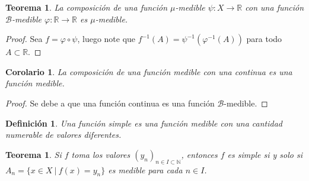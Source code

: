 \documentclass[twoside,12pt,a4 paper,openright]{book}
\newtheorem{teo}[claim]{Teorema}
\newtheorem{cor}[claim]{Corolario}
\newtheorem{defi}[claim]{Definici\'on}
\begin{document}
\begin{teo}
    La composici\'on de una funci\'on $\mu$-medible $\psi:X\to \mathbb R$ con una funci\'on $\mathcal{B}$-medible $\varphi :\mathbb R \to \mathbb R$ es $\mu$-medible.
\end{teo}
\begin{proof}
    Sea $f = \varphi \circ\psi$, luego note que   $f^{-1}(A) = \psi^{-1}(\varphi^{-1}(A))$  para todo $A\subset \mathbb{R}$. 
\end{proof}
\begin{cor}
    La composici\'on de una funci\'on medible con una continua es una funci\'on medible.
\end{cor}
\begin{proof}
 Se debe a que una funci\'on continua es una funci\'on $\mathcal{B}$-medible.
\end{proof}
\begin{defi}
    Una funci\'on simple es una funci\'on medible con   una cantidad   numerable de valores diferentes.
\end{defi}





\begin{teo}
    Si $f$ toma los valores $(y_n)_{n\in I \subset \mathbb{N}}$, entonces $f$ es simple si y solo si $A_n = \{x \in X \  | \  f(x) = y_n\}$ es medible para cada $n\in I$. 
\end{teo}
\end{document}
